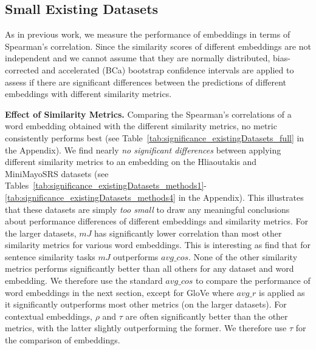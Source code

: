 \documentclass[letterpaper]{article} %
\begin{document}
\subsection{Small Existing Datasets}
As in previous work, we measure the performance of embeddings in terms of Spearman's correlation. Since the similarity scores of different embeddings are not independent and we cannot assume that they are normally distributed, bias-corrected and accelerated (BCa) bootstrap confidence intervals \cite{ZhelezniakEtAl2019-fuzzyJaccard}
are applied to assess if there are significant differences between the predictions of different embeddings with different similarity metrics.

\noindent\textbf{Effect of Similarity Metrics.}
Comparing the Spearman's correlations of a word embedding obtained with the different similarity metrics, no metric consistently performs best (see Table~\ref{tab:significance_existingDatasets_full} in the Appendix).
We find nearly \emph{no significant differences} between applying different similarity metrics to an embedding on the Hliaoutakis and \mbox{MiniMayoSRS} datasets (see Tables~\ref{tab:significance_existingDatasets_methods1}-\ref{tab:significance_existingDatasets_methods4} in the Appendix). This illustrates that these datasets are simply \emph{too small} to draw any meaningful conclusions about performance differences of different embeddings and similarity metrics.
For the larger datasets, $mJ$ has significantly lower correlation than most other similarity metrics for various word embeddings. This is interesting as \citeauthor{ZhelezniakEtAl2019-fuzzyJaccard}  find that for sentence similarity tasks $mJ$ outperforms $avg\_cos$.
None of the other similarity metrics performs significantly better than all others for any dataset and word embedding.
We therefore use the standard $avg\_cos$
to compare the performance of word embeddings in the next section, except for GloVe where $avg\_r$ is applied as it significantly outperforms most other metrics (on the larger datasets).
For contextual embeddings, $\rho$ and $\tau$ are often
significantly better than the other metrics, with the latter slightly outperforming the former. We therefore use $\tau$ for the
comparison of embeddings.
\end{document}
